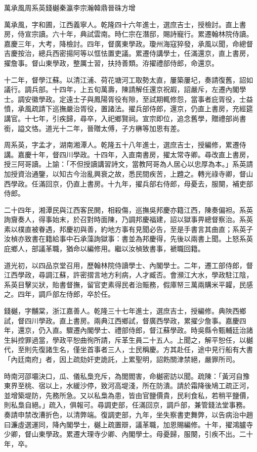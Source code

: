 
\begin{pinyinscope}
萬承風周系英錢樾秦瀛李宗瀚韓鼎晉硃方增

萬承風，字和圃，江西義寧人。乾隆四十六年進士，選庶吉士，授檢討。直上書房，侍宣宗讀。六十年，典試雲南。時仁宗在潛邸，賜詩寵行。累遷翰林院侍讀。嘉慶三年，大考，降檢討。四年，督廣東學政。瓊州海寇猝發，承風以聞，命總督吉慶按治，總兵西密揚阿等以恇怯置吏議。累遷侍講學士，任滿還京，直上書房，擢詹事。督山東學政，整厲士習，扶持善類。洊擢禮部侍郎，命還京。

十二年，督學江蘇。以清江浦、荷花塘河工取勢太直，屢築屢圮，奏請復舊，詔如議行。調兵部。十四年，上五旬萬壽，陳請解任還京祝嘏，詔嚴斥，左遷內閣學士。調安徽學政。定遠士子與鳳陽胥役有隙，至試期輒修怨，當事者庇胥役，士益憤，承風疏請下巡撫嚴治胥役，置諸法。擢兵部侍郎，還京，仍直上書房，充經筵講官。十七年，引疾歸，尋卒，入祀鄉賢祠。宣宗即位，追念舊學，贈禮部尚書銜，謚文恪。道光十二年，晉贈太傅，子方楙等加恩有差。

周系英，字孟才，湖南湘潭人。乾隆五十八年進士，選庶吉士，授編修，累遷侍講。嘉慶十年，督四川學政。十四年，入直南書房，擢太常寺卿。尋改直上書房，授三阿哥讀。上諭：「不但授讀講習詩文，當教阿哥為人居心以忠厚為本。」系英請加授資治通鑒，以知古今治亂興衰之故，悉民間疾苦，上韙之。轉光祿寺卿，督山西學政。任滿回京，仍直上書房。十九年，擢兵部右侍郎，母憂去，服闋，補吏部侍郎。

二十四年，湘潭民與江西客民閧，相殺傷，巡撫吳邦慶亦籍江西，陳奏偏袒。系英詢齎奏人，得事始末，於召對時面陳，乃調邦慶福建，詔以獄事畀總督察治。系英素以樸直被眷遇，邦慶初與善，約地方事有見聞必告，至是手書言其曲直；系英子汝楨亦致書在籍給事中石承藻詢獄事：書並為邦慶得，先後以兩書上聞。上怒系英庇鄉人，部議革職，猶命以編修用。繼以汝楨致書事，褫職回籍。

道光初，以四品京堂召用，歷翰林院侍讀學士、內閣學士。二年，遷工部侍郎，督江西學政，尋調江蘇，許密摺言地方利病，人才臧否。會瀕江大水，學政駐江陰，系英目擊災狀，貽書督撫，留官吏素得民者治賑務，假庫帑三萬兩購米平糶，民感之。四年，調戶部左侍郎，卒於任。

錢樾，字黼棠，浙江嘉善人。乾隆三十七年進士，選庶吉士，授編修。典陜西鄉試，督四川學政。直上書房。兩典江西鄉試，督廣西學政，累擢少詹事。嘉慶四年，還京，仍入直。驟遷內閣學士、禮部侍郎，督江蘇學政。時吳縣令甄輔廷治諸生糾控罪過當，學政平恕曲徇所請，斥革生員二十五人。上聞之，解平恕任，以樾代，至則先復諸生名，僅坐首事者三人，士民稱慶。方其赴任，途中見行船有大書「內廷南府」者，因上疏劾奸吏詭託，上累聖明，詔飭關津禁絕，嚴罪所司。

時南河邵壩決口，瓜、儀私梟充斥，為閭閻害，命樾密訪以聞。疏陳：「黃河自豫東界至桃、宿以上，水緩沙停，致河高堤淺，所在防潰。請於霜降後鳩工疏正河，並增築堤防，先務所急。又以私梟為患，皆由官鹽價貴，民利食私，若稍平鹽價，則私梟自絕。」疏入，俱報可。尋調吏部，任滿回京，調戶部，兼管錢法堂事務。奏請申禁改漕折色，以清弊端。復調吏部，九年，坐失察書吏舞弊，以告病治中趙曰濂虛選運同，降內閣學士，樾上疏置辯，議革職，加恩賜編修。十年，擢鴻臚寺少卿，督山東學政。累遷大理寺少卿、內閣學士。母憂歸，服闋，引疾不出。二十年，卒。


\end{pinyinscope}
